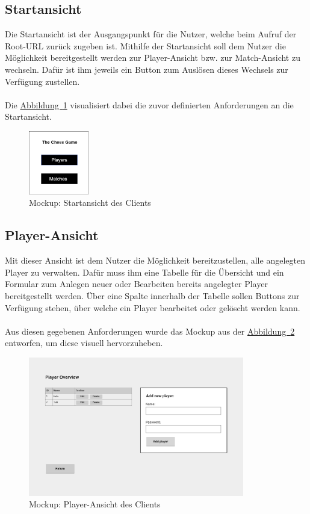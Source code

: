 \subsection{Startansicht}\label{sec:startView}
Die Startansicht ist der Ausgangspunkt für die Nutzer, welche beim Aufruf der Root-\gls{URL} zurück zugeben ist. Mithilfe der Startansicht soll dem Nutzer die Möglichkeit bereitgestellt werden zur Player-Ansicht bzw. zur Match-Ansicht zu wechseln. Dafür ist ihm jeweils ein Button zum Auslösen dieses Wechsels zur Verfügung zustellen.\\
\\
Die \hyperref[fig:startView]{Abbildung~\ref{fig:startView}} visualisiert dabei die zuvor definierten Anforderungen an die Startansicht.
\begin{figure}[htb]
	\includegraphics[width=0.234\textwidth]{images/start-view.png}
	\caption{Mockup: Startansicht des Clients}
	\label{fig:startView}
\end{figure}

\subsection{Player-Ansicht}\label{sec:playerView}
Mit dieser Ansicht ist dem Nutzer die Möglichkeit bereitzustellen, alle angelegten Player zu verwalten. Dafür muss ihm eine Tabelle für die Übersicht und ein Formular zum Anlegen neuer oder Bearbeiten bereits angelegter Player bereitgestellt werden. Über eine Spalte innerhalb der Tabelle sollen Buttons zur Verfügung stehen, über welche ein Player bearbeitet oder gelöscht werden kann.\\
\\
Aus diesen gegebenen Anforderungen wurde das Mockup aus der \hyperref[fig:playerView]{Abbildung~\ref{fig:playerView}} entworfen, um diese visuell hervorzuheben.
\begin{figure}[htb]
	\includegraphics[width=0.84\textwidth]{images/player-view.png}
	\caption{Mockup: Player-Ansicht des Clients}
	\label{fig:playerView}
\end{figure}


